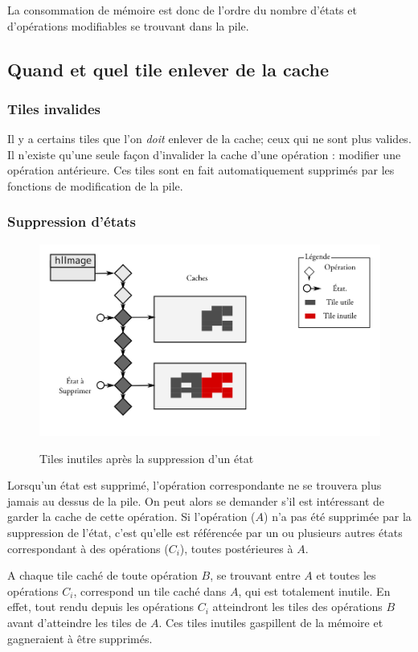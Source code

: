 			La consommation de mémoire est donc de l'ordre du nombre d'états et d'opérations modifiables se trouvant dans la pile.
		\subsection{Quand et quel tile enlever de la cache}
			\subsubsection{Tiles invalides}
			Il y a certains tiles que l'on \emph{doit} enlever de la cache; ceux qui ne sont plus valides. Il n'existe qu'une 
			seule façon d'invalider la cache d'une opération : modifier une opération antérieure. Ces tiles sont en fait
			automatiquement supprimés par les fonctions de modification de la pile.
			
			\subsubsection{Suppression d'états}
		\begin{figure}[ht]
			\centering
			\includegraphics[width=\textwidth]{images/state-destruct} 
			\label{fig:destruct}
			\caption{Tiles inutiles après la suppression d'un état}
		\end{figure}
			Lorsqu'un état est supprimé, l'opération correspondante ne se trouvera plus jamais au dessus de la pile. On peut alors se
			demander s'il est intéressant de garder la cache de cette opération. Si l'opération ($A$) n'a pas été supprimée par la suppression
			de l'état, c'est qu'elle est référencée par un ou plusieurs autres états correspondant à des opérations ($C_i$), toutes postérieures à
			$A$. 

			A chaque tile caché de toute opération $B$, se trouvant entre $A$ et toutes les opérations $C_i$, correspond un tile caché dans $A$,
			qui est totalement inutile. En effet, tout rendu depuis les opérations $C_i$ atteindront les tiles des opérations $B$ avant d'atteindre
			les tiles de $A$. Ces tiles inutiles gaspillent de la mémoire et gagneraient à être supprimés.

